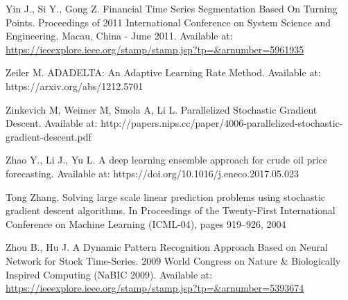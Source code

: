 \documentclass[a4paper,latin]{paper}
\begin{document}
\begin{thebibliography}{bibliography}
Yin J., Si Y., Gong Z. Financial Time Series Segmentation Based On Turning 
Points. Proceedings of 2011 International Conference on System Science and Engineering, Macau, China - June 
2011. Available at: \url{https://ieeexplore.ieee.org/stamp/stamp.jsp?tp=&arnumber=5961935}

Zeiler M. ADADELTA: An Adaptive Learning Rate Method. Available at: https://arxiv.org/abs/1212.5701

Zinkevich M, Weimer M, Smola A, Li L. Parallelized Stochastic Gradient Descent. 
Available at: 
http://papers.nips.cc/paper/4006-parallelized-stochastic-gradient-descent.pdf

Zhao Y., Li J., Yu L. A deep learning ensemble approach for crude oil price 
forecasting.  Available at: https://doi.org/10.1016/j.eneco.2017.05.023

Tong Zhang. Solving large scale linear prediction problems using stochastic gradient descent algorithms. In Proceedings of the Twenty-First International Conference on Machine Learning (ICML-04), pages 919–926, 2004

Zhou B., Hu J. A Dynamic Pattern Recognition Approach Based on Neural Network for Stock Time-Series. 2009 World Congress on Nature \& Biologically Inspired Computing (NaBIC 
2009). Available at:\url{ https://ieeexplore.ieee.org/stamp/stamp.jsp?tp=&arnumber=5393674}

\end{thebibliography}
\end{document}
